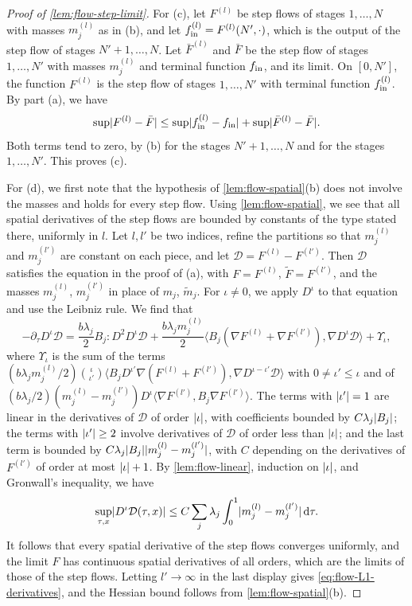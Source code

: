 \begin{proof}[Proof of \cref{lem:flow-step-limit}]
For (c), let $F^{(l)}$ be step flows of stages $1,\dots,N$ with masses
$m_j^{(l)}$ as in (b), and let $f_{\rm in}^{(l)}=F^{(l)}(N',\cdot)$, which is the
output of the step flow of stages $N'+1,\dots,N$. Let $\bar F^{(l)}$ and $\bar F$ be the
step flow of stages $1,\dots,N'$ with masses $m_j^{(l)}$ and terminal function
$f_{\rm in}$, and its limit. On $[0,N']$, the function $F^{(l)}$ is the step flow
of stages $1,\dots,N'$ with terminal function $f^{(l)}_{\rm in}$. By part (a), we have
\[
 \sup\lvert F^{(l)}-\bar F\rvert\le\sup\lvert f^{(l)}_{\rm in}-f_{\rm in}\rvert+\sup\lvert \bar F^{(l)}-\bar F\rvert.
\]
Both terms tend to zero, by (b) for the stages $N'+1,\dots,N$ and for the stages
$1,\dots,N'$. This proves (c).

For (d), we first note that the hypothesis of \cref{lem:flow-spatial}(b) does
not involve the masses and holds for every step flow. Using
\cref{lem:flow-spatial}, we see that all spatial derivatives of the step flows are
bounded by constants of the type stated there, uniformly in $l$. Let $l,l'$ be
two indices, refine the partitions so that $m_j^{(l)}$ and $m_j^{(l')}$ are
constant on each piece, and let $\mathcal D=F^{(l)}-F^{(l')}$. Then $\mathcal D$
satisfies the equation in the proof of (a), with $F=F^{(l)}$,
$\widetilde F=F^{(l')}$, and the masses $m_j^{(l)}$, $m_j^{(l')}$ in place of
$m_j$, $\widetilde m_j$. For $\iota\ne0$, we apply $D^\iota$ to that equation and
use the Leibniz rule. We find that
\[
 -\partial_\tau D^\iota\mathcal D=\frac{b\lambda_j}{2}B_j\mathbin{:}D^2D^\iota\mathcal D
 +\frac{b\lambda_jm^{(l)}_j}{2}\bigl\langle B_j(\nabla F^{(l)}+\nabla F^{(l')}),
 \nabla D^\iota\mathcal D\bigr\rangle+\Upsilon_\iota,
\]
where $\Upsilon_\iota$ is the sum of the terms
$(b\lambda_jm^{(l)}_j/2)\binom\iota{\iota'}\langle B_jD^{\iota'}\nabla(F^{(l)}+F^{(l')}),
\nabla D^{\iota-\iota'}\mathcal D\rangle$ with $0\ne\iota'\le\iota$ and of
$(b\lambda_j/2)(m^{(l)}_j-m^{(l')}_j)D^\iota\langle\nabla F^{(l')},B_j\nabla F^{(l')}\rangle$.
The terms with $\lvert \iota'\rvert=1$ are linear in the derivatives of $\mathcal D$ of
order $\lvert \iota\rvert$, with coefficients bounded by $C\lambda_j\lvert B_j\rvert$; the terms
with $\lvert \iota'\rvert\ge2$ involve derivatives of $\mathcal D$ of order less than
$\lvert \iota\rvert$; and the last term is bounded by
$C\lambda_j\lvert B_j\rvert\lvert m^{(l)}_j-m^{(l')}_j\rvert$, with $C$ depending on the
derivatives of $F^{(l')}$ of order at most $\lvert \iota\rvert+1$. By
\cref{lem:flow-linear}, induction on $\lvert \iota\rvert$, and Gronwall's inequality, we
have
\[
 \sup_{\tau,x}\lvert D^\iota\mathcal D(\tau,x)\rvert
 \le C\sum_j\lambda_j\int_0^1\lvert m^{(l)}_j-m^{(l')}_j\rvert\,\mathrm d\tau.
\]
It follows that every spatial derivative of the step flows converges uniformly,
and the limit $F$ has continuous spatial derivatives of all orders, which are the
limits of those of the step flows. Letting $l'\to\infty$ in the last
display gives \eqref{eq:flow-L1-derivatives}, and the Hessian bound follows from
\cref{lem:flow-spatial}(b).


\end{proof}
